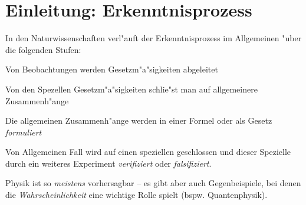 \chapter{Einleitung: Erkenntnisprozess}

In den Naturwissenschaften verl"auft der Erkenntnisprozess im
Allgemeinen "uber die folgenden Stufen:

\begin{description}[\setlabelstyle{\bfseries\slshape}]
\item[Experiment] Von Beobachtungen werden Gesetzm"a"sigkeiten
   abgeleitet
\item[Induktion] Von den Spezellen Gesetzm"a"sigkeiten schlie"st man auf
   allgemeinere Zusammenh"ange
\item[Formulierung] Die allgemeinen Zusammenh"ange werden in einer
   Formel oder als Gesetz \emph{formuliert}
\item[Deduktion] Von Allgemeinen Fall wird auf einen speziellen
   geschlossen und dieser Spezielle durch ein weiteres Experiment
   \emph{verifiziert} oder \emph{falsifiziert}.
\end{description}

Physik ist so \emph{meistens} vorhersagbar -- es gibt aber auch
Gegenbeispiele, bei denen die \emph{Wahrscheinlichkeit} eine wichtige
Rolle spielt (bspw. Quantenphysik).















